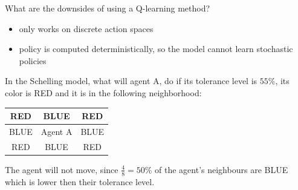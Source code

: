 \documentclass[a4paper,12pt,answers]{exam}
\begin{document}
\begin{questions}
	

	
	\question[15]
	What are the downsides of using a Q-learning method?
	
	\begin{solution}
		\begin{itemize}
			\item only works on discrete action spaces
			\item policy is computed deterministically, so the model cannot learn stochastic policies 
		\end{itemize}
	\end{solution}
	
	\question[15]
	In the Schelling model, what will agent A, do if its tolerance level is $55\%$, its color is RED and it is in the following neighborhood:
	
	\begin{table}[H]
		\centering
		\begin{tabular}{|c|c|c|}
			\hline
			RED & BLUE & RED \\ \hline
			BLUE & Agent A & BLUE \\ \hline
			RED & BLUE & RED \\ \hline
		\end{tabular}
	\end{table}
	
	\begin{solution}
		The agent will not move, since $\frac{4}{8} = 50\%$ of the agent's neighbours are BLUE which is lower then their tolerance level.
	\end{solution}
\end{questions}
\end{document}
